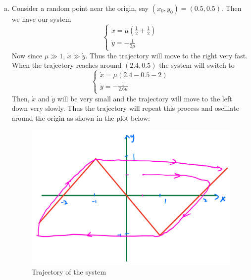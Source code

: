\documentclass[12pt]{exam}
\begin{document}
\begin{enumerate}[(a)]


	\item Consider a random point near the origin, say $(x_0, y_0) = (0.5, 0.5)$. Then we have our system
		\[ \begin{cases}
			\dot{x} = \mu (\frac{1}{2} + \frac{1}{2}) \\
			\dot{y} = -\frac{1}{2\mu}
		\end{cases} \]
		Now since $\mu \gg 1$, $\dot{x} \gg \dot{y}$. Thus the trajectory will move to the right very fast. When the trajectory reaches around $(2.4, 0.5)$ the system will switch to
		\[ \begin{cases}
			\dot{x} = \mu (2.4 - 0.5 - 2) \\
			\dot{y} = -\frac{1}{2.6\mu}
		\end{cases} \]
		Then, $\dot{x}$ and $\dot{y}$ will be very small and the trajectory will move to the left down very slowly. Thus the trajectory will repeat this process and oscillate around the origin as shown in the plot below:
		\begin{figure}[H]
			\centering
			\includegraphics[width=0.8\linewidth]{3c.jpeg}
			\caption{Trajectory of the system}
		\end{figure}









\end{enumerate}
\end{document}
